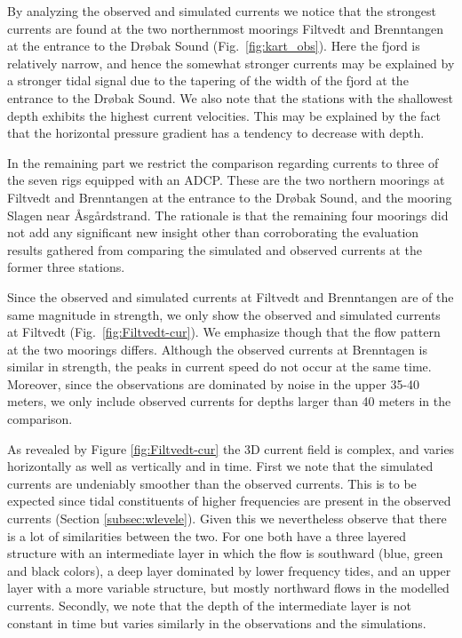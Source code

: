 By analyzing the observed and simulated currents we notice that the strongest currents are found at the two northernmost moorings Filtvedt and Brenntangen at the entrance to the Dr{\o}bak Sound (Fig.~\ref{fig:kart_obs}). Here the fjord is relatively narrow, and hence the somewhat stronger currents may be explained by a stronger tidal signal due to the tapering of the width of the fjord at the entrance to the Dr{\o}bak Sound. We also note that the stations with the shallowest depth exhibits the highest current velocities. This may be explained by the fact that the horizontal pressure gradient has a tendency to decrease with depth.

In the remaining part we restrict the comparison regarding currents to three of the seven rigs equipped with an ADCP. These are the two northern moorings at Filtvedt and Brenntangen at the entrance to the Dr{\o}bak Sound, and the mooring Slagen near {\AA}sg\aa{}rdstrand. The rationale is that the remaining four moorings did not add any significant new insight other than corroborating the evaluation results gathered from comparing the simulated and observed currents at the former three stations.


Since the observed and simulated currents at Filtvedt and Brenntangen are of the same magnitude in strength, we only show the observed and simulated currents at Filtvedt (Fig.~\ref{fig:Filtvedt-cur}). We emphasize though that the flow pattern at the two moorings differs. Although the observed currents at Brenntagen is similar in strength, the peaks in current speed do not occur at the same time. Moreover, since the observations are dominated by noise in the upper 35-40 meters, we only include observed currents for depths larger than 40 meters in the comparison.

As revealed by Figure \ref{fig:Filtvedt-cur} the 3D current field is complex, and varies horizontally as well as vertically and in time. First we note that the simulated currents are undeniably smoother than the observed currents. This is to be expected since tidal constituents of higher frequencies are present in the observed currents (Section \ref{subsec:wlevele}). Given this we nevertheless observe that there is a lot of similarities between the two. For one both have a three layered structure with an intermediate layer in which the flow is southward (blue, green and black colors), a deep layer dominated by lower frequency tides, and an upper layer with a more variable structure, but mostly northward flows in the modelled currents. Secondly, we note that the depth of the intermediate layer is not constant in time but varies similarly in the observations and the simulations.  

